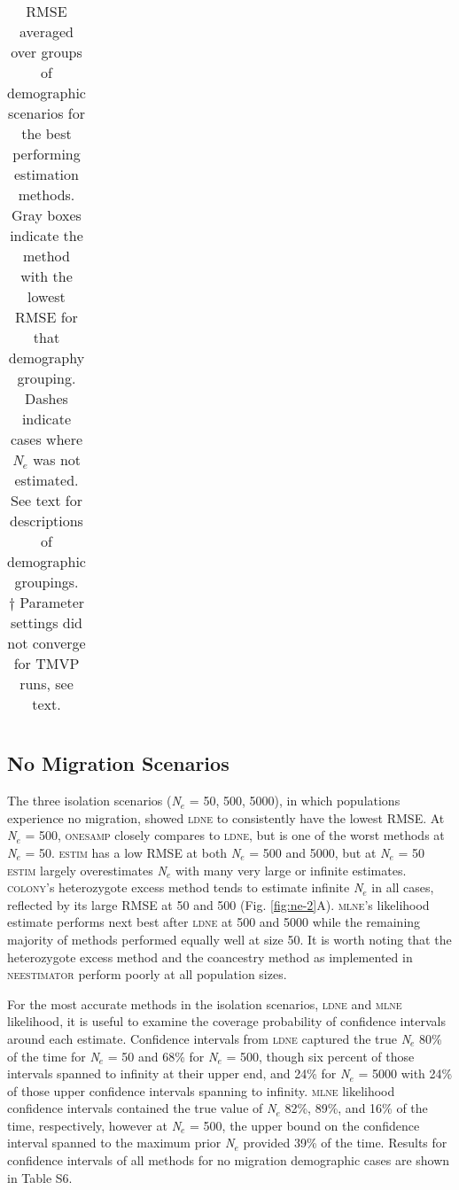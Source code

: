 \begin{table}[]
\begin{tabular}{llllllllllll}
\end{tabular}
\label{tab:ne-2}
\caption{RMSE averaged over groups of demographic scenarios for the best performing estimation 
methods. Gray boxes indicate the method with the lowest RMSE for that demography grouping. 
Dashes indicate cases where \emph{N}$_e$ was not estimated. See text for descriptions of 
demographic groupings. \\
\footnotesize{$\dagger$ Parameter settings did not converge for \textsc{TMVP} runs, see text.}}
\end{table}

\subsection{No Migration Scenarios}
The three isolation scenarios (\emph{N}$_e$ = 50, 500, 5000), in which populations experience 
no migration, showed \textsc{ldne} to consistently have the lowest RMSE. At \emph{N}$_e$ = 500, \textsc{onesamp} closely compares to 
\textsc{ldne}, but is one of the worst methods at \emph{N}$_e$ = 50. \textsc{estim} has a low RMSE 
at both \emph{N}$_e$ = 500 and 5000, but at \emph{N}$_e$ = 50 \textsc{estim} largely overestimates 
\emph{N}$_e$ with many very large or infinite estimates. \textsc{colony}'s heterozygote 
excess method tends to estimate infinite \emph{N}$_e$ in all cases, reflected by its 
large RMSE at 50 and 500 (Fig. \ref{fig:ne-2}A). \textsc{mlne}'s likelihood estimate performs next best 
after \textsc{ldne} at 500 and 5000 while the remaining majority of methods performed equally 
well at size 50. It is worth noting that the heterozygote excess method \citep{Pudovkin:1996} 
and the coancestry method \citep{Nomura:2008} as implemented in \textsc{neestimator} perform poorly at all population sizes.

For the most accurate methods in the isolation scenarios, \textsc{ldne} and \textsc{mlne} 
likelihood, it is useful to examine the coverage probability of confidence intervals around 
each estimate. Confidence intervals from \textsc{ldne} captured the true \emph{N}$_e$ 80\% 
of the time for \emph{N}$_e$ = 50 and 68\% for \emph{N}$_e$ = 500, though six percent of 
those intervals spanned to infinity at their upper end, and 24\% for \emph{N}$_e$ = 5000 with 
24\% of those upper confidence intervals spanning to infinity. \textsc{mlne} likelihood confidence 
intervals contained the true value of \emph{N}$_e$ 82\%, 89\%, and 16\% of the time, respectively, 
however at \emph{N}$_e$ = 500, the upper bound on the confidence interval spanned to the maximum 
prior \emph{N}$_e$ provided 39\% of the time. Results for confidence intervals of all methods 
for no migration demographic cases are shown in Table S6.

